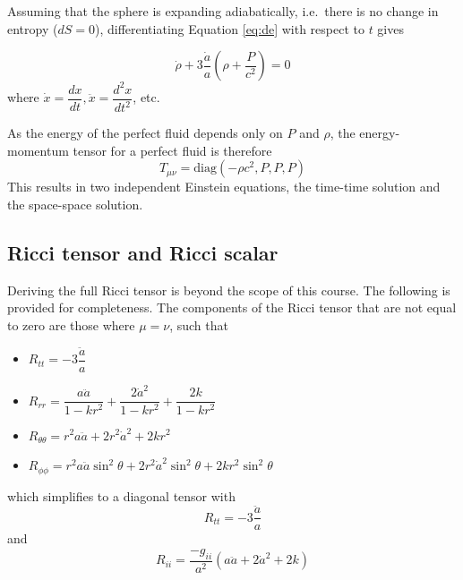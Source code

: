 \documentclass[11pt,a4paper,notoc]{tufte-handout}
\begin{document}
Assuming that the sphere is expanding adiabatically, i.e.~there is no
change in entropy (\(dS = 0\)), differentiating
Equation \eqref{eq:de}
with respect to \(t\) gives

\begin{equation}
    \dot{\rho} + 3\dfrac{\dot{a}}{a}\left(\rho + \dfrac{P}{c^2}\right) = 0
\label{eq:fluid}
\end{equation}
where \(\dot{x} = \dfrac{dx}{dt}, \ddot{x} = \dfrac{d^2x}{dt^2}\), etc.

As the energy of the perfect fluid depends only on \(P\) and \(\rho\), the
energy-momentum tensor for a perfect fluid is therefore
\begin{equation}
T_{\mu\nu} = \text{diag}\left(-\rho c^2, P, P, P\right)
\label{eq:per-fluid}
\end{equation}
This results
in two independent Einstein equations, the time-time solution and the
space-space solution.

\hypertarget{sec:ricci}{%
\subsection{Ricci tensor and Ricci scalar}\label{sec:ricci}}

Deriving the full Ricci tensor is beyond the scope of this course. The
following is provided for completeness. The components of the Ricci
tensor that are not equal to zero are those where \(\mu = \nu\), such that

\begin{itemize}
\item
  \(R_{tt} = -3\dfrac{\ddot{a}}{a}\)
\item
  \(R_{rr} = \dfrac{a\ddot{a}}{1 - kr^2} + \dfrac{2\dot{a}^2}{1 - kr^2} + \dfrac{2k}{1-kr^2}\)
\item
  \(R_{\theta\theta} = r^2a\ddot{a} + 2r^2\dot{a}^2 + 2kr^2\)
\item
  \(R_{\phi\phi} = r^2 a\ddot{a}\sin^2\theta + 2r^2\dot{a}^2\sin^2\theta + 2kr^2 \sin^2\theta\)
\end{itemize}

which simplifies to a diagonal tensor with
\begin{equation}
R_{tt}= -3\dfrac{\ddot{a}}{a}
\label{eq:ric-tt}
\end{equation}
and
\begin{equation}
R_{ii} = \dfrac{-g_{ii}}{a^2}\left(a\ddot{a} + 2\dot{a}^2 + 2k\right)
\label{eq:ric-ii}
\end{equation}
\end{document}
